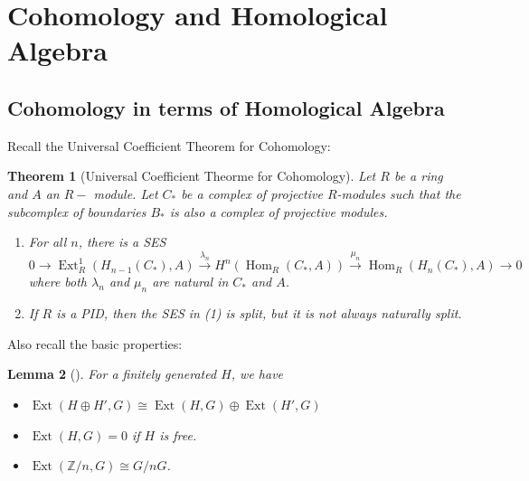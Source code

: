 \documentclass[reqno]{amsart}
\newtheorem{theorem}{Theorem}[section]
\newtheorem{lemma}[theorem]{Lemma}
\theoremstyle{definition}
\theoremstyle{remark}
\DeclareMathOperator{\Hom}{Hom}
\DeclareMathOperator{\Ext}{Ext}
\begin{document}
\section{Cohomology and Homological Algebra}

\subsection{Cohomology in terms of Homological Algebra}

    Recall the Universal Coefficient Theorem for Cohomology:

    \begin{theorem}[Universal Coefficient Theorme for Cohomology]
        Let $R$ be a ring and $A$ an $R-$ module. Let
        $C_*$ be a complex of projective $R$-modules
        such that the subcomplex of boundaries 
        $B_*$ is also a complex of projective modules.
        \begin{enumerate}
            \item For all $n$, there is a SES
                \[
                0 \to \Ext_R^{1} \left( 
                H_{n-1}(C_*),A\right) \stackrel{\lambda_n}{\to} 
                H^{n} \left( \Hom_R \left( C_*,A \right)  \right) 
                \stackrel{\mu_n}{\to} \Hom_R \left( 
                H_n \left( C_* \right), A \right) \to 0
                \] 
                where both $\lambda_n$ and $\mu_n$ are
                natural in $C_*$ and $A$.
            \item If $R$ is a PID, then the SES in (1) is
                split, but it is not always naturally split.
        \end{enumerate}
    \end{theorem}

    Also recall the basic properties:

    \begin{lemma}[]
        For a finitely generated $H$, we have
        \begin{itemize}
            \item $\Ext \left( 
                H \oplus H' , G\right) \cong
                \Ext \left( H, G \right) \oplus
                \Ext(H',G)$
            \item $\Ext (H,G) = 0$ if $H$ is free.
            \item $\Ext (\mathbb{Z} / n, G) \cong
                G / n G$.
        \end{itemize}
    \end{lemma}
\end{document}
